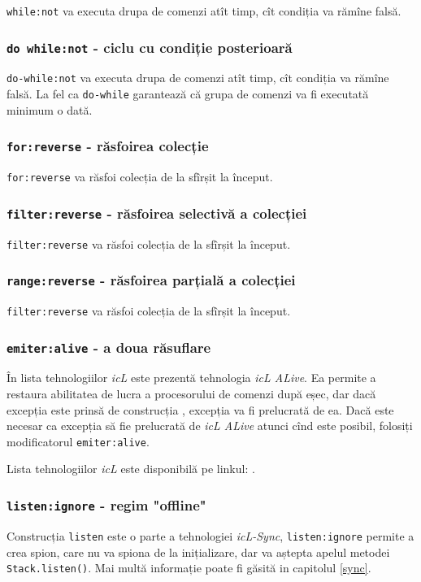\lstinline|while:not| va executa drupa de comenzi atît timp, cît condiția va rămîne falsă.

\subsubsection{\lstinline|do while:not| - ciclu cu condiție posterioară}

\lstinline|do-while:not| va executa drupa de comenzi atît timp, cît condiția va rămîne falsă. La fel ca \lstinline|do-while| garantează că grupa de comenzi va fi executată minimum o dată.

\subsubsection{\lstinline|for:reverse| - răsfoirea colecție}

\lstinline|for:reverse| va răsfoi colecția de la sfîrșit la început.

\subsubsection{\lstinline|filter:reverse| - răsfoirea selectivă a colecției}

\lstinline|filter:reverse| va răsfoi colecția de la sfîrșit la început.

\subsubsection{\lstinline|range:reverse| - răsfoirea parțială a colecției}

\lstinline|filter:reverse| va răsfoi colecția de la sfîrșit la început.

\subsubsection{\lstinline|emiter:alive| - a doua răsuflare}

În lista tehnologiilor \textit{icL} este prezentă tehnologia \textit{icL ALive}. Ea permite a restaura abilitatea de lucra a procesorului de comenzi după eșec, dar dacă excepția este prinsă de construcția , excepția va fi prelucrată de ea. Dacă este necesar ca excepția să fie prelucrată de \textit{icL ALive} atunci cînd este posibil, folosiți modificatorul \lstinline|emiter:alive|.

Lista tehnologiilor \textit{icL} este disponibilă pe linkul: .

\subsubsection{\lstinline|listen:ignore| - regim "offline"}

Construcția \lstinline|listen| este o parte a tehnologiei \textit{icL-Sync}, \lstinline|listen:ignore| permite a crea spion, care nu va spiona de la inițializare, dar va aștepta apelul metodei \lstinline|Stack.listen()|. Mai multă informație poate fi găsită in capitolul \ref{sync}.